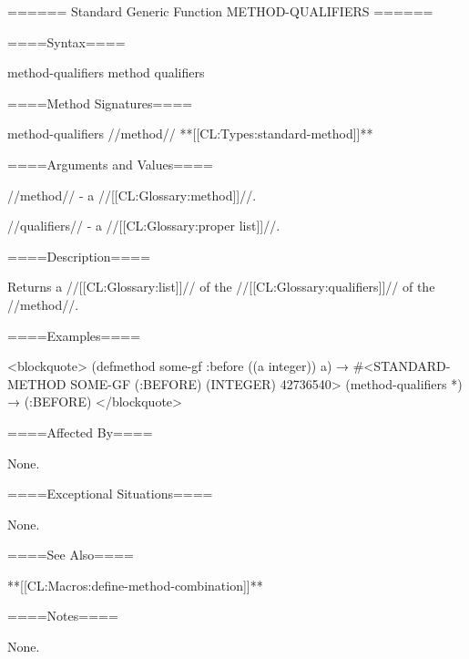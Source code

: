 ====== Standard Generic Function METHOD-QUALIFIERS ======

====Syntax====

\DefgenWithValues method-qualifiers {method} {qualifiers}

====Method Signatures====

\Defmeth method-qualifiers {//method// **[[CL:Types:standard-method]]**}

====Arguments and Values====

//method// - a //[[CL:Glossary:method]]//.

//qualifiers// - a //[[CL:Glossary:proper list]]//.

====Description====

Returns a //[[CL:Glossary:list]]// of the //[[CL:Glossary:qualifiers]]// of the //method//.

====Examples====

<blockquote> (defmethod some-gf :before ((a integer)) a) → #<STANDARD-METHOD SOME-GF (:BEFORE) (INTEGER) 42736540> (method-qualifiers *) → (:BEFORE) </blockquote>

====Affected By====

None.

====Exceptional Situations====

None.

====See Also====

**[[CL:Macros:define-method-combination]]**

====Notes====

None.


